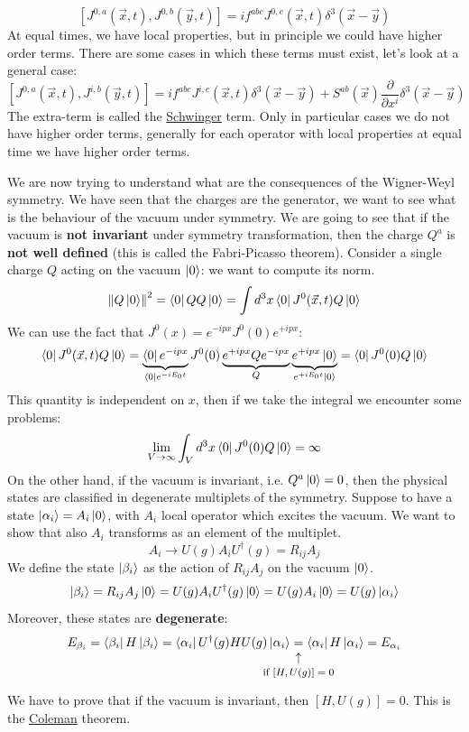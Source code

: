 \documentclass[../main.tex]{subfiles}
\begin{document}
\[
[J^{0,a}(\Vec{x},t),J^{0,b}(\Vec{y},t)]=if^{abc}J^{0,c}(\Vec{x},t)\delta^3(\Vec{x}-\Vec{y})
\]
At equal times, we have local properties, but in principle we could have higher order terms. There are some cases in which these terms must exist, let's look at a general case:
\[
[J^{0,a}(\Vec{x},t),J^{i,b}(\Vec{y},t)]=if^{abc}J^{i,c}(\Vec{x},t)\delta^3(\Vec{x}-\Vec{y})+S^{ab}(\Vec{x})\frac{\partial}{\partial x^i}\delta^3(\Vec{x}-\Vec{y})
\]
The extra-term is called the \href{https://en.wikipedia.org/wiki/Julian_Schwinger}{Schwinger} term. Only in particular cases we do not have higher order terms, generally for each operator with local properties at equal time we have higher order terms.

We are now trying to understand what are the consequences of the Wigner-Weyl symmetry. We have seen that the charges are the generator, we want to see what is the behaviour of the vacuum under symmetry. We are going to see that if the vacuum is \textbf{not invariant} under symmetry transformation, then the charge $Q^a$ is \textbf{not well defined} (this is called the Fabri-Picasso theorem). Consider a single charge $Q$ acting on the vacuum $\ket{0}$: we want to compute its norm.
\[
\norm{Q\ket{0}}^2=\bra{0}QQ\ket{0}=\int d^3x\bra{0}J^0(\Vec{x},t)Q\ket{0}
\]
We can use the fact that $J^0(x)=e^{-ipx}J^0(0)e^{+ipx}$:
\[
\bra{0}J^0(\Vec{x},t)Q\ket{0}=\underbrace{\bra{0}e^{-ipx}}_{\bra{0}e^{-iE_0t}}J^0(0)\underbrace{e^{+ipx}Qe^{-ipx}}_{Q}\underbrace{e^{+ipx}\ket{0}}_{e^{+iE_0t}\ket{0}}=\bra{0}J^0(0)Q\ket{0}
\]
This quantity is independent on $x$, then if we take the integral we encounter some problems:
\[
\lim_{V\to\infty}\int_Vd^3x\bra{0}J^0(0)Q\ket{0}=\infty
\]
On the other hand, if the vacuum is invariant, i.e. $Q^a\ket{0}=0$, then the physical states are classified in degenerate multiplets of the symmetry. Suppose to have a state $\ket{\alpha_i}=A_i\ket{0}$, with $A_i$ local operator which excites the vacuum. We want to show that also $A_i$ transforms as an element of the multiplet.
\[
A_i\to U(g)A_iU^\dagger(g)=R_{ij}A_j
\]
We define the state $\ket{\beta_i}$ as the action of $R_{ij}A_j$ on the vacuum $\ket{0}$.
\[
\ket{\beta_i}=R_{ij}A_j\ket{0}=U(g)A_iU^\dagger(g)\ket{0}=U(g)A_i\ket{0}=U(g)\ket{\alpha_i}
\]
Moreover, these states are \textbf{degenerate}:
\[
E_{\beta_i}=\bra{\beta_i}H\ket{\beta_i}=\bra{\alpha_i}U^\dagger(g)HU(g)\ket{\alpha_i}\underset{\mathclap{\tikz \node {$\uparrow$} node [below=1ex] {\footnotesize if $[H,U(g)]=0$ };}}{=}\bra{\alpha_i}H\ket{\alpha_i}=E_{\alpha_i}
\]
We have to prove that if the vacuum is invariant, then $[H,U(g)]=0$. This is the \href{https://en.wikipedia.org/wiki/Sidney_Coleman}{Coleman} theorem.
\end{document}
